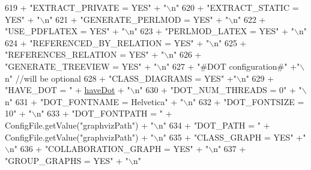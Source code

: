 \begin{DoxyCode}
619                     + \textcolor{stringliteral}{"EXTRACT\_PRIVATE = YES"} + \textcolor{stringliteral}{"\(\backslash\)n"}
620                     + \textcolor{stringliteral}{"EXTRACT\_STATIC = YES"} + \textcolor{stringliteral}{"\(\backslash\)n"}
621                     + \textcolor{stringliteral}{"GENERATE\_PERLMOD = YES"} + \textcolor{stringliteral}{"\(\backslash\)n"}
622                     + \textcolor{stringliteral}{"USE\_PDFLATEX = YES"} + \textcolor{stringliteral}{"\(\backslash\)n"}
623                     + \textcolor{stringliteral}{"PERLMOD\_LATEX = YES"} + \textcolor{stringliteral}{"\(\backslash\)n"}
624                     + \textcolor{stringliteral}{"REFERENCED\_BY\_RELATION = YES"} + \textcolor{stringliteral}{"\(\backslash\)n"}
625                     + \textcolor{stringliteral}{"REFERENCES\_RELATION = YES"} + \textcolor{stringliteral}{"\(\backslash\)n"}
626                     + \textcolor{stringliteral}{"GENERATE\_TREEVIEW = YES"} + \textcolor{stringliteral}{"\(\backslash\)n"}
627                     + \textcolor{stringliteral}{"#DOT configuration#"} +\textcolor{stringliteral}{"\(\backslash\)n"}   \textcolor{comment}{//will be optional}
628                     + \textcolor{stringliteral}{"CLASS\_DIAGRAMS = YES"} +\textcolor{stringliteral}{"\(\backslash\)n"}
629                     + \textcolor{stringliteral}{"HAVE\_DOT = "} + \hyperlink{classit_1_1isislab_1_1masonassisteddocumentation_1_1mason_1_1analizer_1_1_global_utility_a396066731dbc923fe85d28988511ba46}{haveDot} + \textcolor{stringliteral}{"\(\backslash\)n"}
630                     + \textcolor{stringliteral}{"DOT\_NUM\_THREADS = 0"} + \textcolor{stringliteral}{"\(\backslash\)n"}
631                     + \textcolor{stringliteral}{"DOT\_FONTNAME = Helvetica"} + \textcolor{stringliteral}{"\(\backslash\)n"}
632                     + \textcolor{stringliteral}{"DOT\_FONTSIZE = 10"} + \textcolor{stringliteral}{"\(\backslash\)n"}
633                     + \textcolor{stringliteral}{"DOT\_FONTPATH = "} + ConfigFile.getValue(\textcolor{stringliteral}{"graphvizPath"}) + \textcolor{stringliteral}{"\(\backslash\)n"}
634                     + \textcolor{stringliteral}{"DOT\_PATH = "} + ConfigFile.getValue(\textcolor{stringliteral}{"graphvizPath"}) + \textcolor{stringliteral}{"\(\backslash\)n"}
635                     + \textcolor{stringliteral}{"CLASS\_GRAPH = YES"} +\textcolor{stringliteral}{"\(\backslash\)n"}
636                     + \textcolor{stringliteral}{"COLLABORATION\_GRAPH = YES"} + \textcolor{stringliteral}{"\(\backslash\)n"}
637                     + \textcolor{stringliteral}{"GROUP\_GRAPHS = YES"} + \textcolor{stringliteral}{"\(\backslash\)n"}

\end{DoxyCode}
